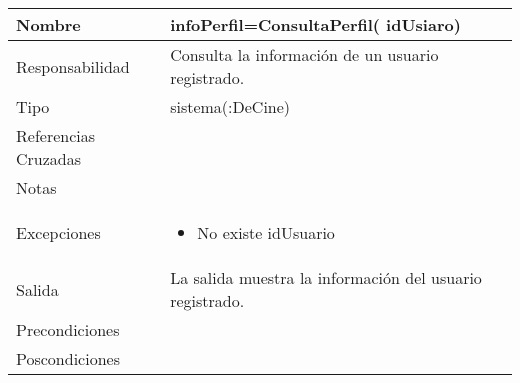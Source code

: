 \documentclass{article}
\begin{document}
\begin{table}[h]
\begin{tabular}{|l|l|l|l|l|l|}
\hline
\multicolumn{2}{|p{3cm}|}{Nombre} & \multicolumn{4}{p{10cm}|}{\textbf{infoPerfil=ConsultaPerfil( idUsiaro)}}\\
\hline
\multicolumn{2}{|p{3cm}|}{Responsabilidad} & \multicolumn{4}{p{10cm}|}{Consulta la información de un usuario registrado.} \\
\hline
\multicolumn{2}{|p{3cm}|}{Tipo} & \multicolumn{4}{p{10cm}|}{sistema(:DeCine)} \\
\hline
\multicolumn{2}{|p{3cm}|}{Referencias Cruzadas} & \multicolumn{4}{p{10cm}|}{} \\
\hline
\multicolumn{2}{|p{3cm}|}{Notas} & \multicolumn{4}{p{10cm}|}{} \\
\hline
\multicolumn{2}{|p{3cm}|}{Excepciones} & \multicolumn{4}{p{10cm}|}{\begin{itemize}
\item No existe idUsuario
\end{itemize}} \\
\hline
\multicolumn{2}{|p{3cm}|}{Salida} & \multicolumn{4}{p{10cm}|}{La salida muestra la información del usuario registrado.} \\
\hline
\multicolumn{2}{|p{3cm}|}{Precondiciones} & \multicolumn{4}{p{10cm}|}{} \\
\hline
\multicolumn{2}{|p{3cm}|}{Poscondiciones} & \multicolumn{4}{p{10cm}|}{} \\
\hline
\end{tabular}
\end{table}
\end{document}
